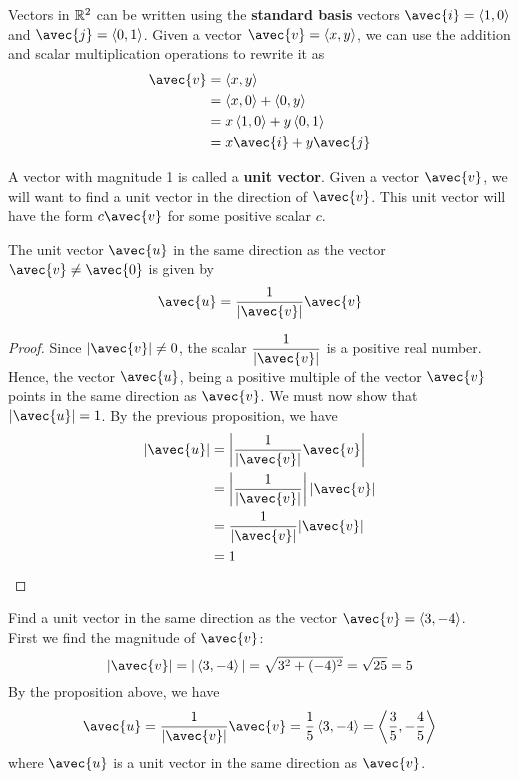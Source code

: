 \documentclass[handout]{ximera}
\begin{document}
Vectors in $\mathbb R^2$ can be written using the {\bf standard basis} vectors $\avec{i} = \vector{1,0}$ and $\avec{j} = \vector{0,1}$.  
Given a vector $\avec{v} = \vector{x,y}$, we can use the addition and scalar multiplication operations to rewrite it as
\begin{align*}
\avec{v} &= \vector{x,y}\\
         &= \vector{x,0} + \vector{0,y}\\
         &= x\vector{1,0} + y \vector{0,1}\\
         &= x\avec{i} + y\avec{j}
\end{align*}

A vector with magnitude 1 is called a {\bf unit vector}. Given a vector $\avec{v}$, we will want to find a unit vector in the direction of $\avec{v}$.
This unit vector will have the form $c\avec{v}$ for some positive scalar $c$.  
\begin{proposition}
The unit vector $\avec{u}$ in the same direction as the vector $\avec{v} \neq \avec{0}$ is given by 
\[
\avec{u} = \frac{1}{|\avec{v}|} \avec{v}
\]
\begin{proof}
Since $|\avec{v}| \neq 0$, the scalar $\displaystyle \frac{1}{|\avec{v}|}$ is a positive real number.  Hence, the vector $\avec{u}$, being a positive multiple of 
the vector $\avec{v}$ points in the same direction as $\avec{v}$. We must now show that $|\avec{u}| = 1$.  By the previous proposition, we have
\begin{align*}
|\avec{u}| &= \left| \frac{1}{|\avec{v}|} \avec{v} \right|\\
           &= \left| \frac{1}{|\avec{v}|} \right| |\avec{v}|\\
           &= \frac{1}{|\avec{v}|} |\avec{v}|\\
           &= 1
\end{align*}
\end{proof}
\end{proposition}

\begin{example}
Find a unit vector in the same direction as the vector $\avec{v} = \vector{3, -4}$.\\
First we find the magnitude of $\avec{v}$:
\[
|\avec{v}| = |\vector{3, -4}| = \sqrt{3^2 + (-4)^2} = \sqrt{25} = 5
\]
By the proposition above, we have
\[
\avec{u} = \frac{1}{|\avec{v}|} \avec{v} = \frac15 \vector{3, -4} = \vector{\frac35, -\frac45}
\]
where $\avec{u}$ is a unit vector in the same direction as $\avec{v}$.
\end{example}
\end{document}
